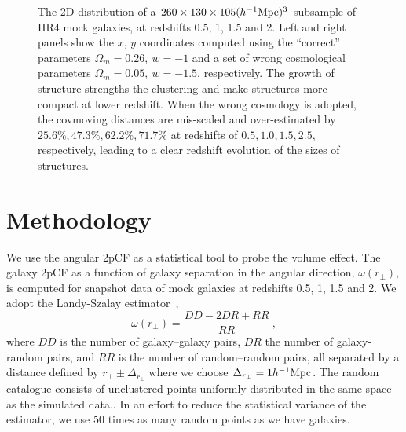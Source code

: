 \documentclass[iop]{emulateapj}
\begin{document}

\begin{figure}
   \caption{\label{fig_scatter}
  The 2D distribution of a $260\times130\times105 (h^{-1}{\rm Mpc})^3$ subsample of HR4 mock galaxies, 
  at redshifts 0.5, 1, 1.5 and 2.
  Left and right panels show the $x$, $y$ coordinates computed using the ``correct'' parameters $\Omega_m=0.26,\ w=-1$ 
  and a set of wrong cosmological parameters $\Omega_m=0.05,\ w=-1.5$, respectively.
  The growth of structure strengths the clustering and make structures more compact at lower redshift.
  When the wrong cosmology is adopted, the covmoving distances are mis-scaled and over-estimated by $25.6\%,47.3\%,62.2\%,71.7\%$ at redshifts of $0.5,1.0,1.5,2.5$, respectively,  leading to a clear redshift evolution of the sizes of structures.
   }
\end{figure}

\section{Methodology}


We use the angular 2pCF as a statistical tool to probe the volume effect.
The galaxy 2pCF as a function of galaxy separation in the angular direction, $\omega(r_\perp)$, is computed for snapshot data of mock galaxies at redshifts 0.5, 1, 1.5 and 2.
We adopt the Landy-Szalay estimator~\citep{1993ApJ...412...64L},
\begin{equation}
\omega(r_\perp)=\frac{DD-2DR+RR}{RR}\ ,
\end{equation}
where $DD$ is the number of galaxy--galaxy pairs, 
$DR$ the number of galaxy-random pairs, 
and $RR$ is the number of random--random pairs, 
all separated by a distance defined by $r_\perp\pm\Delta_{r_\perp}$ where we choose $\Delta_{r_\perp}=1h^{-1}\rm Mpc$.
The random catalogue consists of unclustered points uniformly distributed in the same space as the simulated data.. 
In an effort to reduce the statistical variance of the estimator, we use 50 times as many random points as we have galaxies.
\end{document}
